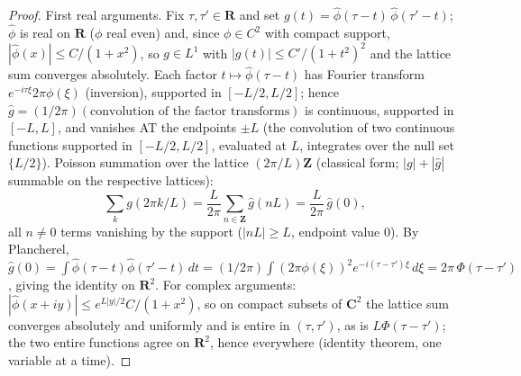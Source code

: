 \documentclass[11pt]{article}
\theoremstyle{plain}
\theoremstyle{definition}
\theoremstyle{remark}
\newcommand{\Z}{\mathbf{Z}}
\newcommand{\R}{\mathbf{R}}
\newcommand{\Cx}{\mathbf{C}}
\newcommand{\ph}{\widehat{\phi}}
\begin{document}
\begin{proof}
First real arguments. Fix $\tau, \tau' \in \R$ and set
$g(t) = \ph(\tau - t)\, \ph(\tau' - t)$; $\ph$ is real on $\R$ ($\phi$ real even)
and, since $\phi \in C^2$ with compact support,
$|\ph(x)| \le C/(1 + x^2)$, so $g \in L^1$ with
$|g(t)| \le C'/(1 + t^2)^2$ and the lattice sum converges absolutely. Each factor
$t \mapsto \ph(\tau - t)$ has Fourier transform
$e^{-i\tau\xi} 2\pi \phi(\xi)$ (inversion), supported in $[-L/2, L/2]$; hence
$\widehat{g} = (1/2\pi)(\text{convolution of the factor transforms})$ is
continuous, supported in $[-L, L]$, and vanishes AT the endpoints $\pm L$ (the
convolution of two continuous functions supported in $[-L/2, L/2]$, evaluated at
$L$, integrates over the null set $\{L/2\}$). Poisson summation over the lattice
$(2\pi/L)\Z$ (classical form; $|g| + |\widehat{g}|$ summable on the respective
lattices):
\[
  \sum_k g(2\pi k/L)
  = \frac{L}{2\pi} \sum_{n \in \Z} \widehat{g}(nL)
  = \frac{L}{2\pi}\, \widehat{g}(0),
\]
all $n \ne 0$ terms vanishing by the support ($|nL| \ge L$, endpoint value $0$).
By Plancherel,
$\widehat{g}(0) = \int \ph(\tau - t) \ph(\tau' - t)\, dt
 = (1/2\pi) \int (2\pi\phi(\xi))^2 e^{-i(\tau - \tau')\xi}\, d\xi
 = 2\pi\, \Phi(\tau - \tau')$,
giving the identity on $\R^2$. For complex arguments:
$|\ph(x + iy)| \le e^{L|y|/2} C/(1 + x^2)$, so on compact subsets of $\Cx^2$ the
lattice sum converges absolutely and uniformly and is entire in $(\tau, \tau')$,
as is $L\Phi(\tau - \tau')$; the two entire functions agree on $\R^2$, hence
everywhere (identity theorem, one variable at a time).
\end{proof}
\end{document}
